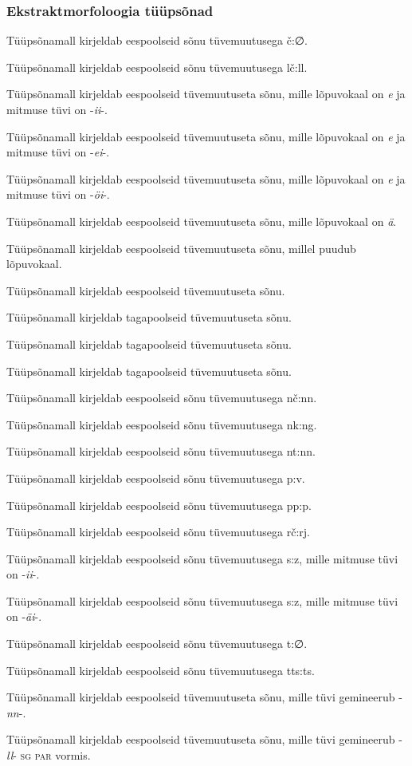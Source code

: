 \documentclass[12pt,a4paper]{article}
\newcommand{\msd}[1]{\textsc{#1}}
\begin{document}
\subsubsection*{Ekstraktmorfoloogia tüüpsõnad}
\vspace{-3.5em}

Tüüpsõna\-mall kirjeldab eespoolseid sõnu tüvemuutusega č:∅.

Tüüpsõna\-mall kirjeldab eespoolseid sõnu tüvemuutusega lč:ll.

Tüüpsõna\-mall kirjeldab eespoolseid tüvemuutuseta sõnu, mille lõpuvokaal on \textit{e} ja mitmuse tüvi on -\textit{ii}-.

Tüüpsõna\-mall kirjeldab eespoolseid tüvemuutuseta sõnu, mille lõpuvokaal on \textit{e} ja mitmuse tüvi on -\textit{ei}-.

Tüüpsõna\-mall kirjeldab eespoolseid tüvemuutuseta sõnu, mille lõpuvokaal on \textit{e} ja mitmuse tüvi on -\textit{öi}-.

Tüüpsõna\-mall kirjeldab eespoolseid tüvemuutuseta sõnu, mille lõpuvokaal on \textit{ä}.

Tüüpsõna\-mall kirjeldab eespoolseid tüvemuutuseta sõnu, millel puudub lõpuvokaal.

Tüüpsõna\-mall kirjeldab eespoolseid tüvemuutuseta sõnu.

Tüüpsõna\-mall kirjeldab tagapoolseid tüvemuutuseta sõnu.

Tüüpsõna\-mall kirjeldab tagapoolseid tüvemuutuseta sõnu.

Tüüpsõna\-mall kirjeldab tagapoolseid tüvemuutuseta sõnu.

Tüüpsõna\-mall kirjeldab eespoolseid sõnu tüvemuutusega nč:nn.

Tüüpsõna\-mall kirjeldab eespoolseid sõnu tüvemuutusega nk:ng.

Tüüpsõna\-mall kirjeldab eespoolseid sõnu tüvemuutusega nt:nn.

Tüüpsõna\-mall kirjeldab eespoolseid sõnu tüvemuutusega p:v.

Tüüpsõna\-mall kirjeldab eespoolseid sõnu tüvemuutusega pp:p.

Tüüpsõna\-mall kirjeldab eespoolseid sõnu tüvemuutusega rč:rj.

Tüüpsõna\-mall kirjeldab eespoolseid sõnu tüvemuutusega s:z, mille mitmuse tüvi on -\textit{ii}-.

Tüüpsõna\-mall kirjeldab eespoolseid sõnu tüvemuutusega s:z, mille mitmuse tüvi on -\textit{äi}-.

Tüüpsõna\-mall kirjeldab eespoolseid sõnu tüvemuutusega t:∅.

Tüüpsõna\-mall kirjeldab eespoolseid sõnu tüvemuutusega tts:ts.

Tüüpsõna\-mall kirjeldab eespoolseid tüvemuutuseta sõnu, mille tüvi gemineerub -\textit{nn}-.

Tüüpsõna\-mall kirjeldab eespoolseid tüvemuutuseta sõnu, mille tüvi gemineerub -\textit{ll}- \msd{sg par} vormis.
\end{document}
